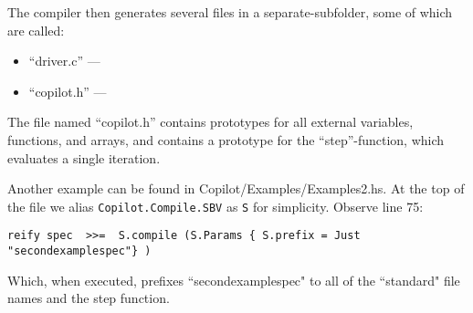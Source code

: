 The compiler then generates several files in a separate-subfolder, some of which are called:

\begin{itemize}
\item ``driver.c'' ---
\item ``copilot.h'' ---
\end{itemize}

The file named ``copilot.h'' contains prototypes for all external variables,
functions, and arrays, and contains a prototype for the ``step''-function,
which evaluates a single iteration.

Another example can be found in Copilot/Examples/Examples2.hs. At the top of the 
file we alias {\tt Copilot.Compile.SBV} as {\tt S} for simplicity. Observe line 75:

\begin{lstlisting}[language = Copilot]
reify spec  >>=  S.compile (S.Params { S.prefix = Just "secondexamplespec"} )
\end{lstlisting}

Which, when executed, prefixes ``secondexamplespec" to all of the ``standard" file names and
the step function.


